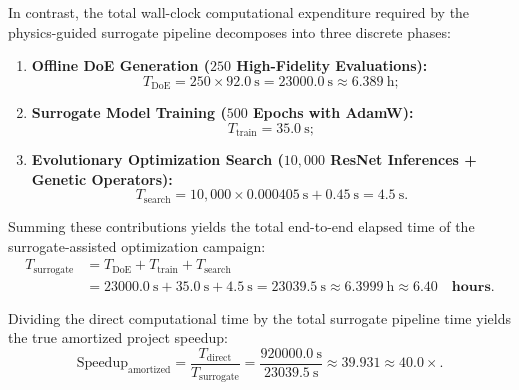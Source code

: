 In contrast, the total wall-clock computational expenditure required by the physics-guided surrogate pipeline decomposes into three discrete phases:
\begin{enumerate}
\item \textbf{Offline DoE Generation ($250$ High-Fidelity Evaluations):}
\begin{equation}
T_{\text{DoE}} = 250 \times \SI{92.0}{\second} = \SI{23000.0}{\second} \approx \SI{6.389}{\hour};
\label{eq:time_doe}
\end{equation}
\item \textbf{Surrogate Model Training ($500$ Epochs with AdamW):}
\begin{equation}
T_{\text{train}} = \SI{35.0}{\second};
\label{eq:time_train}
\end{equation}
\item \textbf{Evolutionary Optimization Search ($10{,}000$ ResNet Inferences + Genetic Operators):}
\begin{equation}
T_{\text{search}} = 10{,}000 \times \SI{0.000405}{\second} + \SI{0.45}{\second} = \SI{4.5}{\second}.
\label{eq:time_search}
\end{equation}
\end{enumerate}

Summing these contributions yields the total end-to-end elapsed time of the surrogate-assisted optimization campaign:
\begin{align}
T_{\text{surrogate}} &= T_{\text{DoE}} + T_{\text{train}} + T_{\text{search}} \nonumber \\
&= \SI{23000.0}{\second} + \SI{35.0}{\second} + \SI{4.5}{\second} = \SI{23039.5}{\second} \approx \SI{6.3999}{\hour} \approx \mathbf{6.40\quad \textbf{hours}}.
\label{eq:time_surrogate_total}
\end{align}

Dividing the direct computational time by the total surrogate pipeline time yields the true amortized project speedup:
\begin{equation}
\text{Speedup}_{\text{amortized}} = \frac{T_{\text{direct}}}{T_{\text{surrogate}}} = \frac{\SI{920000.0}{\second}}{\SI{23039.5}{\second}} \approx 39.931 \approx \mathbf{40.0\times}.
\label{eq:amortized_speedup}
\end{equation}

